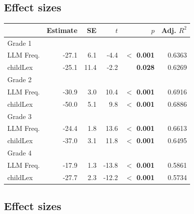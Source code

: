 \documentclass[manuscript]{stjour}
\begin{document}
\clearpage


\subsection{Effect sizes}

\begin{table}[!htbp]
\centering
\begin{tabular}{lrrrrr}
  \hline
 & Estimate & SE & $t$ & $p$ & Adj. $R^2$   \\ 
  \hline
  Grade 1 \\ 
  LLM Freq. & -27.1 & 6.1 & -4.4 & \textbf{$<$ 0.001} & 0.6363 \\ 
  childLex & -25.1 & 11.4 & -2.2 & \textbf{0.028} & 0.6269\\ 
  Grade 2 \\ 
  LLM Freq. & -30.9 & 3.0 & 10.4 & \textbf{$<$ 0.001} & 0.6916 \\ 
  childLex & -50.0 & 5.1 & 9.8 & \textbf{$<$ 0.001} & 0.6886 \\ 
    Grade 3 \\ 
  LLM Freq. & -24.4 & 1.8 & 13.6 & \textbf{$<$ 0.001} & 0.6613 \\ 
  childLex & -37.0 & 3.1 & 11.8 & \textbf{$<$ 0.001} & 0.6495 \\ 
      Grade 4 \\ 
  LLM Freq. & -17.9 & 1.3 & -13.8 & \textbf{$<$ 0.001} & 0.5861 \\ 
  childLex & -27.7 & 2.3 & -12.2 & \textbf{$<$ 0.001} & 0.5734 \\ 
  \hline
\end{tabular}
\label{effsize}
\end{table}

\clearpage


\subsection{Effect sizes}
\end{document}
